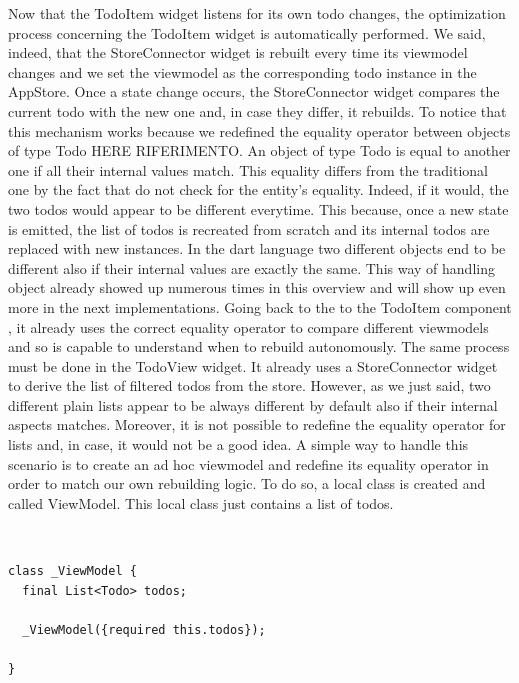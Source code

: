Now that the TodoItem widget listens for its own todo changes, the optimization process concerning the TodoItem widget is automatically performed. We said, indeed, that the StoreConnector widget is rebuilt every time its viewmodel changes and we set the viewmodel as the corresponding todo instance in the AppStore. Once a state change occurs, the StoreConnector widget compares the current todo with the new one and, in case they differ, it rebuilds. To notice that this mechanism works because we redefined the equality operator between objects of type Todo HERE RIFERIMENTO. An object of type Todo is equal to another one if all their internal values match. This equality differs from the traditional one by the fact that do not check for the entity’s equality. Indeed, if it would, the two todos would appear to be different everytime. This because, once a new state is emitted, the list of todos is recreated from scratch and its internal todos are replaced with new instances. In the dart language two different objects end to be different also if their internal values are exactly the same. This way of handling object already showed up numerous times in this overview and will show up even more in the next implementations. Going back to the to the TodoItem component , it already uses the correct equality operator to compare different viewmodels and so is capable to understand when to rebuild autonomously. The same process must be done in the TodoView widget. It already uses a StoreConnector widget to derive the list of filtered todos from the store. However, as we just said, two different plain lists appear to be always different by default also if their internal aspects matches. Moreover, it is not possible to redefine the equality operator for lists and, in case, it would not be a good idea. A simple way to handle this scenario is to create an ad hoc viewmodel and redefine its equality operator in order to match our own rebuilding logic. To do so, a local class is created and called ViewModel. This local class just contains a list of todos.
\begin{code}
\mbox{}\\
 \mbox{}
		\label{code:2.14}
\begin{verbatim}
class _ViewModel {
  final List<Todo> todos;

  _ViewModel({required this.todos});

}
\end{verbatim}
\mbox{}
\end{code}

